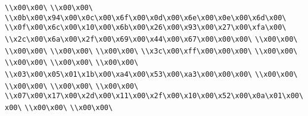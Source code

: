 \verb|\\x00\x00\|\newline
\verb|\\x00\x00\|\newline
\verb|\\x0b\x00\x94\x00\x0c\x00\x6f\x00\x0d\x00\x6e\x00\x0e\x00\x6d\x00\|\newline
\verb|\\x0f\x00\x6c\x00\x10\x00\x6b\x00\x26\x00\x93\x00\x27\x00\xfa\x00\|\newline
\verb|\\x2c\x00\x6a\x00\x2f\x00\x69\x00\x44\x00\x67\x00\x00\x00\|\newline
\verb|\\x00\x00\|\newline
\verb|\\x00\x00\|\newline
\verb|\\x00\x00\|\newline
\verb|\\x00\x00\|\newline
\verb|\\x3c\x00\xff\x00\x00\x00\|\newline
\verb|\\x00\x00\|\newline
\verb|\\x00\x00\|\newline
\verb|\\x00\x00\|\newline
\verb|\\x00\x00\|\newline
\verb|\\x03\x00\x05\x01\x1b\x00\xa4\x00\x53\x00\xa3\x00\x00\x00\|\newline
\verb|\\x00\x00\|\newline
\verb|\\x00\x00\|\newline
\verb|\\x00\x00\|\newline
\verb|\\x00\x00\|\newline
\verb|\\x07\x00\x17\x00\x2d\x00\x11\x00\x2f\x00\x10\x00\x52\x00\x0a\x01\x00\x00\|\newline
\verb|\\x00\x00\|\newline
\verb|\\x00\x00\|\newline

